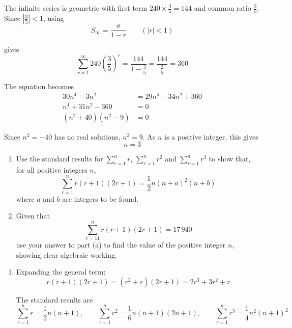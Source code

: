 \documentclass[leqno]{article}
\begin{document}
\begin{enumerate}[
  label=\textbf{\arabic*.},
  leftmargin=*,
  topsep=0pt,
  partopsep=0pt,
  parsep=0pt
]
\begin{djsSolution}
\begin{enumerate}[label=\textbf{(\alph*)}, start=1]
The infinite series is geometric with first term \(240\times\frac35=144\) and common ratio \(\frac35\). Since \(\left|\frac35\right|<1\), using
\[
S_\infty=\frac{a}{1-r}\qquad(|r|<1)
\]

gives
\[
\sum_{r=1}^{\infty}240\left(\dfrac35\right)^r=\dfrac{144}{1-\frac35}=\dfrac{144}{\frac25}=360
\]

The equation becomes
\begin{align*}
30n^4-3n^2&=29n^4-34n^2+360\\
n^4+31n^2-360&=0\\
\left(n^2+40\right)\left(n^2-9\right)&=0
\end{align*}

Since \(n^2=-40\) has no real solutions, \(n^2=9\). As \(n\) is a positive integer, this gives
\[
n=3
\]

\end{enumerate}
\end{djsSolution}

\newpage

\questionitem

\begin{enumerate}[label=\textbf{(\alph*)}]
  \item Use the standard results for $\sum_{r=1}^{n} r$, $\sum_{r=1}^{n} r^2$ and $\sum_{r=1}^{n} r^3$ to show that, for all positive integers $n$,
  \[\sum_{r=1}^{n} r(r+1)(2r+1) = \dfrac{1}{2}n(n+a)^2(n+b)\]
  where $a$ and $b$ are integers to be found.  \\
  \item Given that
  \[\sum_{r=11}^{n} r(r+1)(2r+1) = 17\,940\]
  use your answer to part (a) to find the value of the positive integer $n$, showing clear algebraic working.  \\
\end{enumerate}

\vspace*{10pt}

\begin{djsSolution}
\begin{enumerate}[label=\textbf{(\alph*)}, start=1]
  \item Expanding the general term:
\[
r(r+1)(2r+1)=(r^2+r)(2r+1)=2r^3+3r^2+r
\]

The standard results are
\[
\sum_{r=1}^{n} r=\dfrac12 n(n+1),\qquad \sum_{r=1}^{n} r^2=\dfrac16 n(n+1)(2n+1),\qquad \sum_{r=1}^{n} r^3=\dfrac14 n^2(n+1)^2
\]


\end{enumerate}
\end{djsSolution}
\end{enumerate}
\end{document}
